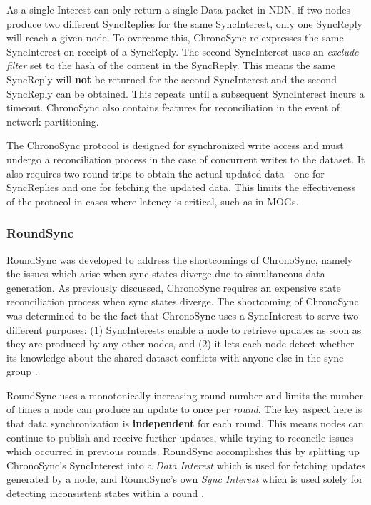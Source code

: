 As a single Interest can only return a single Data packet in NDN, if two nodes produce two different SyncReplies for the same SyncInterest, only one SyncReply will reach a given node. To overcome this, ChronoSync re-expresses the same SyncInterest on receipt of a SyncReply. The second SyncInterest uses an \textit{exclude filter} set to the hash of the content in the SyncReply. This means the same SyncReply will \textbf{not} be returned for the second SyncInterest and the second SyncReply can be obtained. This repeats until a subsequent SyncInterest incurs a timeout. ChronoSync also contains features for reconciliation in the event of network partitioning.

The ChronoSync protocol is designed for synchronized write access and must undergo a reconciliation process in the case of concurrent writes to the dataset. It also requires two round trips to obtain the actual updated data - one for SyncReplies and one for fetching the updated data. This limits the effectiveness of the protocol in cases where latency is critical, such as in MOGs.


\subsubsection*{RoundSync}
RoundSync was developed to address the shortcomings of ChronoSync, namely the issues which arise when sync states diverge due to simultaneous data generation. As previously discussed, ChronoSync requires an expensive state reconciliation process when sync states diverge. The shortcoming of ChronoSync was determined to be the fact that ChronoSync uses a SyncInterest to serve two different purposes: (1) SyncInterests enable a node to retrieve updates as soon as they are produced by any other nodes, and (2) it lets each node detect whether its knowledge about the shared dataset conflicts with anyone else in the sync group \cite{roundsync}.


RoundSync uses a monotonically increasing round number and limits the number of times a node can produce an update to once per \textit{round}. The key aspect here is that data synchronization is \textbf{independent} for each round. This means nodes can continue to publish and receive further updates, while trying to reconcile issues which occurred in previous rounds. RoundSync accomplishes this by splitting up ChronoSync's SyncInterest into a \textit{Data Interest} which is used for fetching updates generated by a node, and RoundSync's own \textit{Sync Interest} which is used solely for detecting inconsistent states within a round \cite{roundsync}.

